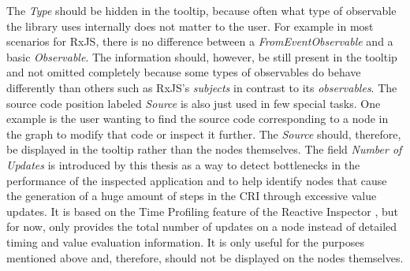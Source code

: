 The \emph{Type} should be hidden in the tooltip, because often what type of observable the library uses internally does not matter to the user. For example in most scenarios for RxJS, there is no difference between a \emph{FromEventObservable} and a basic \emph{Observable}. The information should, however, be still present in the tooltip and not omitted completely because some types of observables do behave differently than others such as RxJS's \emph{subjects} in contrast to its \emph{observables}. The source code position labeled \emph{Source} is also just used in few special tasks. One example is the user wanting to find the source code corresponding to a node in the graph to modify that code or inspect it further. The \emph{Source} should, therefore, be displayed in the tooltip rather than the nodes themselves. The field \emph{Number of Updates} is introduced by this thesis as a way to detect bottlenecks in the performance of the inspected application and to help identify nodes that cause the generation of a huge amount of steps in the CRI through excessive value updates. It is based on the Time Profiling feature of the Reactive Inspector \cite{ReactiveInspector}, but for now, only provides the total number of updates on a node instead of detailed timing and value evaluation information. It is only useful for the purposes mentioned above and, therefore, should not be displayed on the nodes themselves.


